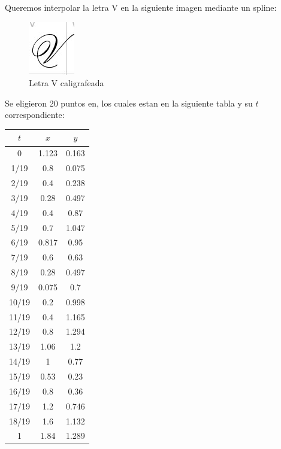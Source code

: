 
Queremos interpolar la letra V en la siguiente imagen mediante un spline:
\begin{figure}[H]
	\centering
	\includegraphics[scale=0.9]{img/v.jpg}
	\caption{Letra V caligrafeada}
\end{figure}
Se eligieron 20 puntos en, los cuales estan en la siguiente tabla y su $t$ correspondiente:
\begin{center}
	\begin{longtable}{|c|c|c|} \hline
		$t$   & $x$   & $y$ \\ \hline \hline
		0     & 1.123 & 0.163  \\ \hline
		1/19  & 0.8   & 0.075  \\ \hline
		2/19  & 0.4   & 0.238  \\ \hline
		3/19  & 0.28  & 0.497  \\ \hline
		4/19  & 0.4   & 0.87   \\ \hline
		5/19  & 0.7   & 1.047  \\ \hline
		6/19  & 0.817 & 0.95   \\ \hline
		7/19  & 0.6   & 0.63   \\ \hline
		8/19  & 0.28  & 0.497  \\ \hline
		9/19  & 0.075 & 0.7    \\ \hline
		10/19 & 0.2   & 0.998  \\ \hline
		11/19 & 0.4   & 1.165  \\ \hline
		12/19 & 0.8   & 1.294  \\ \hline
		13/19 & 1.06  & 1.2    \\ \hline
		14/19 & 1     & 0.77   \\ \hline
		15/19 & 0.53  & 0.23   \\ \hline
		16/19 & 0.8   & 0.36   \\ \hline
		17/19 & 1.2   & 0.746  \\ \hline
		18/19 & 1.6   & 1.132  \\ \hline
		1     & 1.84  & 1.289  \\ \hline
		
	\end{longtable}
\end{center}

